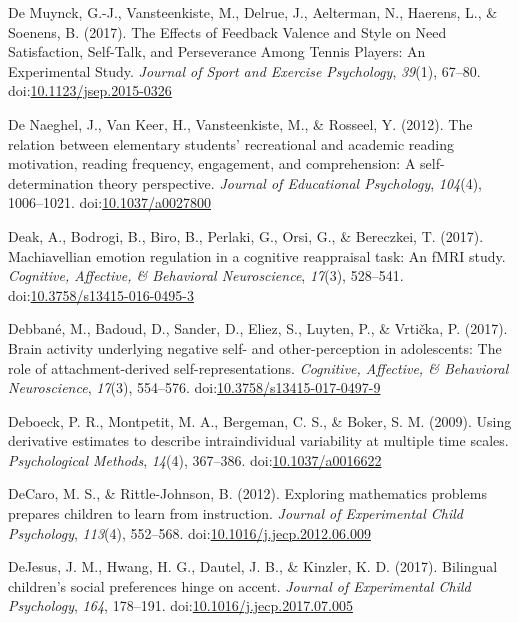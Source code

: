 \documentclass[english,man]{apa6}
\begin{document}
\hypertarget{ref-DeMuynck2017a}{}
De Muynck, G.-J., Vansteenkiste, M., Delrue, J., Aelterman, N., Haerens,
L., \& Soenens, B. (2017). The Effects of Feedback Valence and Style on
Need Satisfaction, Self-Talk, and Perseverance Among Tennis Players: An
Experimental Study. \emph{Journal of Sport and Exercise Psychology},
\emph{39}(1), 67--80.
doi:\href{https://doi.org/10.1123/jsep.2015-0326}{10.1123/jsep.2015-0326}

\hypertarget{ref-DeNaeghel2012}{}
De Naeghel, J., Van Keer, H., Vansteenkiste, M., \& Rosseel, Y. (2012).
The relation between elementary students' recreational and academic
reading motivation, reading frequency, engagement, and comprehension: A
self-determination theory perspective. \emph{Journal of Educational
Psychology}, \emph{104}(4), 1006--1021.
doi:\href{https://doi.org/10.1037/a0027800}{10.1037/a0027800}

\hypertarget{ref-Deak2017}{}
Deak, A., Bodrogi, B., Biro, B., Perlaki, G., Orsi, G., \& Bereczkei, T.
(2017). Machiavellian emotion regulation in a cognitive reappraisal
task: An fMRI study. \emph{Cognitive, Affective, \& Behavioral
Neuroscience}, \emph{17}(3), 528--541.
doi:\href{https://doi.org/10.3758/s13415-016-0495-3}{10.3758/s13415-016-0495-3}

\hypertarget{ref-Debbane2017}{}
Debbané, M., Badoud, D., Sander, D., Eliez, S., Luyten, P., \& Vrtička,
P. (2017). Brain activity underlying negative self- and other-perception
in adolescents: The role of attachment-derived self-representations.
\emph{Cognitive, Affective, \& Behavioral Neuroscience}, \emph{17}(3),
554--576.
doi:\href{https://doi.org/10.3758/s13415-017-0497-9}{10.3758/s13415-017-0497-9}

\hypertarget{ref-Deboeck2009}{}
Deboeck, P. R., Montpetit, M. A., Bergeman, C. S., \& Boker, S. M.
(2009). Using derivative estimates to describe intraindividual
variability at multiple time scales. \emph{Psychological Methods},
\emph{14}(4), 367--386.
doi:\href{https://doi.org/10.1037/a0016622}{10.1037/a0016622}

\hypertarget{ref-DeCaro2012}{}
DeCaro, M. S., \& Rittle-Johnson, B. (2012). Exploring mathematics
problems prepares children to learn from instruction. \emph{Journal of
Experimental Child Psychology}, \emph{113}(4), 552--568.
doi:\href{https://doi.org/10.1016/j.jecp.2012.06.009}{10.1016/j.jecp.2012.06.009}

\hypertarget{ref-DeJesus2017}{}
DeJesus, J. M., Hwang, H. G., Dautel, J. B., \& Kinzler, K. D. (2017).
Bilingual children's social preferences hinge on accent. \emph{Journal
of Experimental Child Psychology}, \emph{164}, 178--191.
doi:\href{https://doi.org/10.1016/j.jecp.2017.07.005}{10.1016/j.jecp.2017.07.005}
\end{document}
